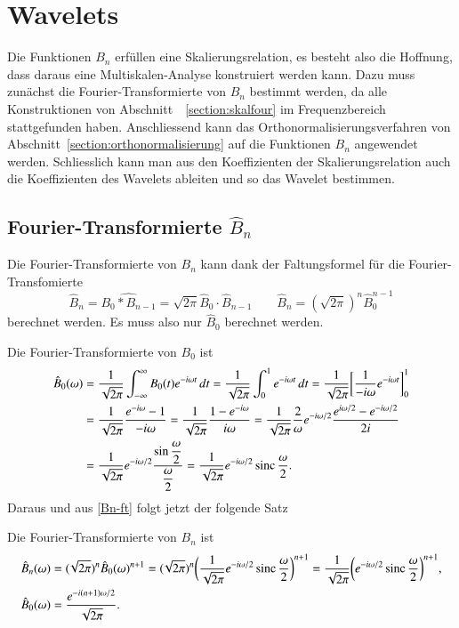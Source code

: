 %
%
%
\section{Wavelets
\label{section:spline-wavelets}}
Die Funktionen $B_n$ erfüllen eine Skalierungsrelation, es besteht also
die Hoffnung, dass daraus eine Multiskalen-Analyse konstruiert werden kann.
Dazu muss zunächst die Fourier-Transformierte von $B_n$ bestimmt werden,
da alle Konstruktionen von Abschnitt~ \ref{section:skalfour} im
Frequenzbereich stattgefunden haben.
Anschliessend kann das Orthonormalisierungsverfahren von
Abschnitt~\ref{section:orthonormalisierung} auf die Funktionen $B_n$
angewendet werden.
Schliesslich kann man aus den Koeffizienten der Skalierungsrelation
auch die Koeffizienten des Wavelets ableiten und so das Wavelet
bestimmen.

\subsection{Fourier-Transformierte $\hat{B}_n$
\label{subsection:spline-ft}}
Die Fourier-Transformierte von $B_n$ kann dank der Faltungsformel für die
Fourier-Transfomierte 
\begin{equation}
\hat{B}_n = \widehat{B_0 * B_{n-1}} = \sqrt{2\pi}\hat{B}_0 \cdot \hat{B}_{n-1}
\qquad
\hat{B}_n = (\!\sqrt{2\pi})^n \hat{B}_0^{n-1}
\label{Bn-ft}
\end{equation}
berechnet werden.
Es muss also nur $\hat{B}_0$ berechnet werden.

Die Fourier-Transformierte von $B_0$ ist
\begin{align*}
\hat{B}_0(\omega)
&=
\frac1{\sqrt{2\pi}}
\int_{-\infty}^{\infty}
B_0(t) e^{-i\omega t}\,dt
=
\frac1{\sqrt{2\pi}}
\int_0^1 e^{-i\omega t}\,dt
=
\frac1{\sqrt{2\pi}}
\biggl[
\frac{1}{-i\omega} 
e^{-i\omega t}
\biggr]_0^1
\\
&=
\frac1{\sqrt{2\pi}}
\frac{e^{-i\omega}-1}{-i\omega}
=
\frac1{\sqrt{2\pi}}
\frac{1-e^{-i\omega}}{i\omega}
=
\frac1{\sqrt{2\pi}}
\frac{2}{\omega}
e^{-i\omega/2}
\frac{e^{i\omega/2} - e^{-i\omega/2}}{2i}
\\
&=
\frac1{\sqrt{2\pi}}
e^{-i\omega/2}
\frac{\displaystyle\sin\frac{\omega}2}{\displaystyle\frac{\omega}2}
=
\frac1{\sqrt{2\pi}}
e^{-i\omega/2}
\sinc\frac{\omega}2.
\end{align*}
Daraus und aus \eqref{Bn-ft} folgt jetzt der folgende Satz

\begin{satz}
\label{satz:Bn-ft}
Die Fourier-Transformierte von $B_n$ ist
\begin{align*}
\hat{B}_n(\omega)
&=
(\!\sqrt{2\pi})^n
\hat{B}_0(\omega)^{n+1}
=
(\!\sqrt{2\pi})^n
\biggl(
\frac{1}{\sqrt{2\pi}}
e^{-i\omega/2} \sinc\frac{\omega}2
\biggr)^{n+1}
=
\frac{1}{\sqrt{2\pi}}
\biggl(
e^{-i\omega/2} \sinc\frac{\omega}2
\biggr)^{n+1},
\\
\hat{B}_0(\omega)
&=
\frac{e^{-i(n+1)\omega/2}}{\sqrt{2\pi}}
.
\end{align*}
\end{satz}

